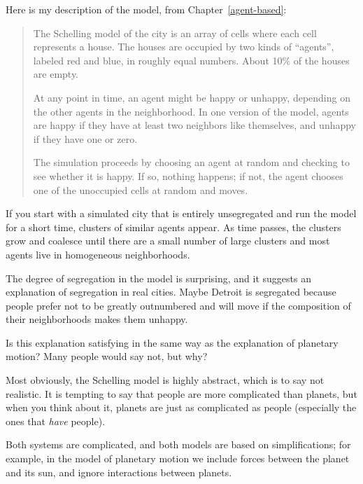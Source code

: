\documentclass[12pt]{book}
\theoremstyle{exercise}
\begin{document}

Here is my description of the model, from Chapter~\ref{agent-based}:

\begin{quote}
The Schelling model of the city is an array of cells where each cell
represents a house.  The houses are occupied by two kinds of
``agents'', labeled red and blue, in roughly equal numbers.  About
10\% of the houses are empty.


At any point in time, an agent might be happy or unhappy, depending
on the other agents in the neighborhood.
In one version of the model, agents are happy if they have at least
two neighbors like themselves, and unhappy if they have one or zero.


The simulation proceeds by choosing an agent at random and checking
to see whether it is happy.  If so, nothing happens; if not,
the agent chooses one of the unoccupied cells at
random and moves.
\end{quote}

If you start with a simulated city that is entirely unsegregated and
run the model for a short time, clusters of similar agents appear.  As
time passes, the clusters grow and coalesce until there are a small
number of large clusters and most agents live in homogeneous
neighborhoods.


The degree of segregation in the model is surprising, and it suggests
an explanation of segregation in real cities.  Maybe Detroit is
segregated because people prefer not to be greatly outnumbered and
will move if the composition of their neighborhoods makes them
unhappy.


Is this explanation satisfying in the same way as the explanation of
planetary motion?  Many people would say not, but why?

Most obviously, the Schelling model is highly abstract, which is to
say not realistic.  It is tempting to say that people are more complicated
than planets, but when you think about it, planets are just as complicated
as people (especially the ones that {\em have} people).


Both systems are complicated, and both models are based on
simplifications; for example, in the model of planetary motion we
include forces between the planet and its sun, and ignore interactions
between planets.
\end{document}

